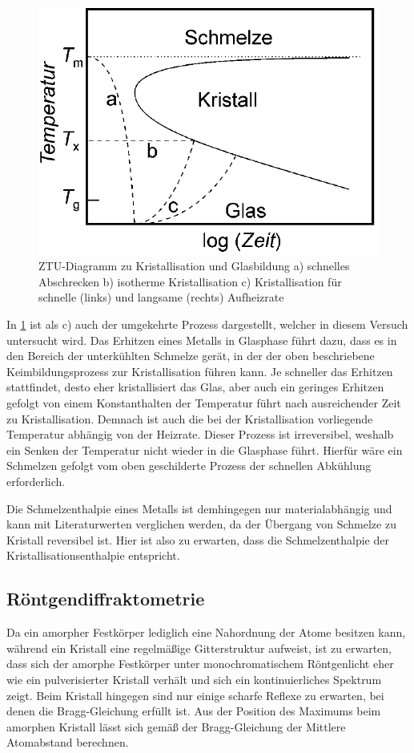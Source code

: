 \documentclass[
	a4paper,
	12pt,
	pagesize,
	ngerman
]{scrartcl}
\begin{document}
	\begin{figure}[H]
			\includegraphics[width= 0.7 \linewidth]{img/kristallisierung}
			\caption{
			ZTU-Diagramm zu Kristallisation und Glasbildung
			a) schnelles Abschrecken
			b) isotherme Kristallisation
			c) Kristallisation für schnelle (links) und langsame (rechts) Aufheizrate
			\cite{anleitung}
			}
			\label{fig_kristallisierung}
	\end{figure}

	In \cref{fig_kristallisierung} ist als c) auch der umgekehrte Prozess dargestellt, welcher in diesem Versuch untersucht wird.
	Das Erhitzen eines Metalls in Glasphase führt dazu, dass es in den Bereich der unterkühlten Schmelze gerät, in der der oben beschriebene Keimbildungsprozess zur Kristallisation führen kann.
	Je schneller das Erhitzen stattfindet, desto eher kristallisiert das Glas, aber auch ein geringes Erhitzen gefolgt von einem Konstanthalten der Temperatur führt nach ausreichender Zeit zu Kristallisation.
	Demnach ist auch die bei der Kristallisation vorliegende Temperatur abhängig von der Heizrate.
	Dieser Prozess ist irreversibel, weshalb ein Senken der Temperatur nicht wieder in die Glasphase führt.
	Hierfür wäre ein Schmelzen gefolgt vom oben geschilderte Prozess der schnellen Abkühlung erforderlich.

	Die Schmelzenthalpie eines Metalls ist demhingegen nur materialabhängig und kann mit Literaturwerten verglichen werden, da der Übergang von Schmelze zu Kristall reversibel ist.
	Hier ist also zu erwarten, dass die Schmelzenthalpie der Kristallisationsenthalpie entspricht. %

	\subsection{Röntgendiffraktometrie}
	Da ein amorpher Festkörper lediglich eine Nahordnung der Atome besitzen kann, während ein Kristall eine regelmäßige Gitterstruktur aufweist, ist zu erwarten, dass sich der amorphe Festkörper unter monochromatischem Röntgenlicht eher wie ein pulverisierter Kristall verhält und sich ein kontinuierliches Spektrum zeigt.
	Beim Kristall hingegen sind nur einige scharfe Reflexe zu erwarten, bei denen die Bragg-Gleichung erfüllt ist. %
	Aus der Position des Maximums beim amorphen Kristall lässt sich gemäß der Bragg-Gleichung der Mittlere Atomabstand berechnen.
\end{document}
